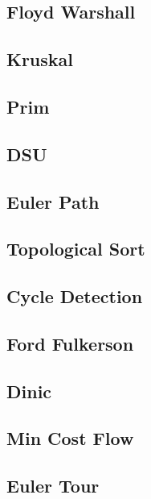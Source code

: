 \subsection{Floyd Warshall}
\raggedbottom
\hrulefill
\subsection{Kruskal}
\raggedbottom
\hrulefill
\subsection{Prim}
\raggedbottom
\hrulefill
\subsection{DSU}
\raggedbottom
\hrulefill
\subsection{Euler Path}
\raggedbottom
\hrulefill
\subsection{Topological Sort}
\raggedbottom
\hrulefill
\subsection{Cycle Detection}
\raggedbottom
\hrulefill
\subsection{Ford Fulkerson}
\raggedbottom
\hrulefill
\subsection{Dinic}
\raggedbottom
\hrulefill
\subsection{Min Cost Flow}
\raggedbottom
\hrulefill
\subsection{Euler Tour}
\raggedbottom
\hrulefill
